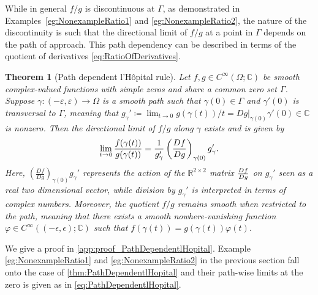 \documentclass{article}
\newcommand{\Albert}[1]{{\color[rgb]{0.2,0.4,0.8}\textbf{Albert: } #1}}
\theoremstyle{theorem}
\newtheorem{theorem}{Theorem}
\theoremstyle{definition}
\def\CC{\mathbb{C}}
\def\RR{\mathbb{R}}
\begin{document}
While in general \(f/g\) is discontinuous at \(\Gamma\), as demonstrated in Examples~\ref{eg:NonexampleRatio1} and \ref{eg:NonexampleRatio2}, the nature of the discontinuity is such that the directional limit of \(f/g\) at a point in \(\Gamma\) depends on the path of approach.  This path dependency can be described in terms of the quotient of derivatives \eqref{eq:RatioOfDerivatives}.
\begin{theorem}[Path dependent l'H\^opital rule]\label{thm:PathDependentlHopital}
    Let \(f,g\in C^\infty(\Omega;\CC)\) be smooth complex-valued functions with simple zeros and share a common zero set \(\Gamma\).  
    Suppose \(\gamma\colon (-\varepsilon,\varepsilon)\to\Omega\) is a smooth path such that \(\gamma(0) \in \Gamma\) and \(\gamma'(0)\) is transversal to \(\Gamma\), meaning that \(g_\gamma'\coloneqq \lim_{t\to 0} g(\gamma(t))/t=Dg|_{\gamma(0)}\gamma'(0)\in\CC\) is nonzero.  Then the directional limit of \(f/g\) along \(\gamma\) exists and is given by 
    \begin{align}
    \label{eq:PathDependentlHopital}
        \lim_{t\to 0} \frac{f(\gamma(t))}{g(\gamma(t))} = {1\over g_\gamma'}\left(\frac{Df}{Dg}\right)_{\gamma(0)}g_\gamma'.
    \end{align}
    Here, \(\left(\frac{Df}{Dg}\right)_{\gamma(0)}g_\gamma'\) represents the action of the \(\RR^{2\times 2}\) matrix \({Df\over Dg}\) on \(g_\gamma'\) seen as a real two dimensional vector, while division by  \(g_\gamma'\) is interpreted in terms of complex numbers.  Moreover, the quotient \(f/g\) remains smooth when restricted to the path, meaning that there exists a smooth nowhere-vanishing function \(\varphi\in C^\infty((-\epsilon,\epsilon);\CC)\) such that \(f(\gamma(t)) = g(\gamma(t))\varphi(t)\).
\end{theorem}
We give a proof in \autoref{app:proof_PathDependentlHopital}.
Example \autoref{eg:NonexampleRatio1} and \autoref{eg:NonexampleRatio2} in the previous section fall onto the case of \autoref{thm:PathDependentlHopital} and their path-wise limits at the zero is given as in \eqref{eq:PathDependentlHopital}.
\end{document}

